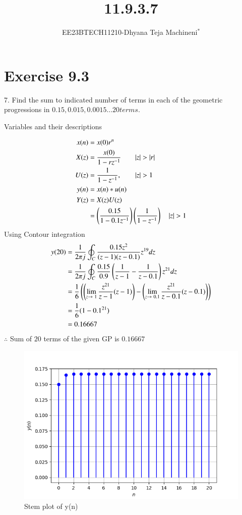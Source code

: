 \documentclass[journal,12pt,twocolumn]{IEEEtran}
\theoremstyle{remark}
\begin{document}

\vspace{3cm}
\title{\textbf{11.9.3.7}}
\author{EE23BTECH11210-Dhyana Teja Machineni$^{*}$%
}
\maketitle
\newpage
\bigskip

\section*{Exercise 9.3}
7. \hspace{2pt}Find the sum to indicated number of terms in each of the geometric progressions in
$0.15, 0.015, 0.0015\ldots 20 terms$.

\solution
\fi
     \begin{table}[h]
         \label{tab:table2}
         
         \caption{Variables and their descriptions}
     \end{table}
\begin{align}
x(n) &= x(0)r^n \\
X(z) &= \frac{x(0)}{1-rz^{-1}} \qquad |z| > |r| \\
U(z)&=\frac{1}{1-z^{-1}}, \qquad |z|>1\\
y(n)&= x(n)*u(n)\\
Y(z)&=X(z)U(z)\\
&=\brak{ \frac{0.15}{1-0.1z^{-1}}}\brak{\frac{1}{1-z^{-1}}}\quad|z| > 1
\end{align}
Using Contour integration
\begin{align}
y(20)&=\frac{1}{2\pi j}\oint_C \frac{0.15 z^2}{(z-1)(z-0.1)}z^{19} dz\\
&=\frac{1}{2 \pi j}\oint_C \frac{0.15}{0.9} \left(\frac{1}{z-1} - \frac{1}{z-0.1}\right)z^{21}dz\\
&= \frac{1}{6} \left(\left(\lim_{z\to \ 1}\frac{z^{21}}{z-1} (z-1)\right)-\left(\lim_{z \to \ 0.1}\frac{z^{21}}{z-0.1} (z-0.1)\right)\right)\\
&= \frac{1}{6}(1- 0.1^{21})\\
    &=0.16667
\end{align}
        $\therefore$ Sum of $20$ terms of the given GP is $0.16667$
       \renewcommand{\thefigure}{\theenumi}
 \renewcommand{\thetable}{\theenumi}
\begin{figure}[h]
  
  \includegraphics[width=\columnwidth]{ncert-maths/11/9/3/7/figs/graph.png}
  \caption{Stem plot of y(n)}
\end{figure}
\end{document}
